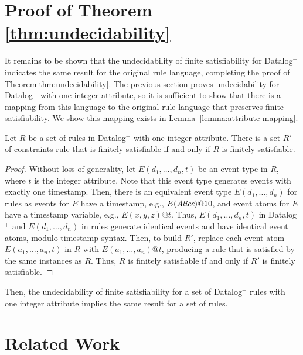 \section{Proof of Theorem \ref{thm:undecidability}}
\label{section:reduce-to-rules}

It remains to be shown that 
the undecidability of finite satisfiability for Datalog$^{+}$ 
indicates the same result for the original rule language,
completing the proof of Theorem\:\ref{thm:undecidability}.
The previous section proves undecidability for Datalog$^{+}$
with one integer attribute,
so it is sufficient to show that
there is a mapping from this language
to the original rule language
that preserves finite satisfiability.
We show this mapping exists
in Lemma\:~\ref{lemma:attribute-mapping}.

\begin{lemma}\label{lemma:attribute-mapping}
Let $R$ be a set of rules in Datalog$^{+}$
with one integer attribute.
There is a set $R'$ of constraints rule
that is finitely satisfiable
if and only if $R$ is finitely satisfiable.
\end{lemma}

\begin{proof}
Without loss of generality,
let $E(d_1, \dots, d_n, t)$
be an event type in $R$,
where $t$ is the integer attribute.
Note that this event type
generates events with exactly one timestamp.
Then,
there is an equivalent event type $E(d_1, \dots, d_n)$ for rules
as events for $E$ have a timestamp,
e.g., $E(\mbox{\em Alice})@10$,
and event atoms for $E$ have a timestamp variable,
e.g., $E(x, y, z)@t$.
Thus, $E(d_1,\dots,d_n,t)$ in Datalog$^{+}$
and $E(d_1,\dots,d_n)$ in rules
generate identical events
and have identical event atoms, modulo timestamp syntax.
Then,
to build $R'$,
replace each event atom $E(a_1,\dots,a_n,t)$ in $R$
with $E(a_1,\dots,a_n)@t$,
producing a rule
that is satisfied by the same instances as $R$.
Thus,
$R$ is finitely satisfiable if and only if $R'$ is finitely satisfiable.
\end{proof}

Then,
the undecidability of finite satisfiability for a set of Datalog$^{+}$ rules
with one integer attribute
implies the same result for a set of rules.

\section{Related Work}
\label{section:finite-satisfiability-related-work}

